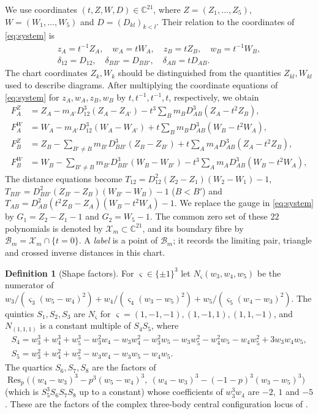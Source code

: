 \documentclass[11pt]{amsart}
\theoremstyle{definition}
\newtheorem{definition}[theorem]{Definition}
\theoremstyle{remark}
\newcommand{\C}{\mathbb{C}}
\begin{document}
{We use coordinates $(t,Z,W,D)\in\C^{21}$, where $Z=(Z_1,\dots,Z_5)$,
$W=(W_1,\dots,W_5)$ and $D=(D_{kl})_{k<l}$.  Their relation to the coordinates of
\eqref{eq:system} is}
\begin{equation}\label{eq:d2-chart}
\begin{gathered}
  z_A=t^{-1}Z_A,\quad w_A=tW_A,\quad z_B=tZ_B,\quad w_B=t^{-1}W_B,\\
  \delta_{12}=D_{12},\quad \delta_{BB'}=D_{BB'},\quad \delta_{AB}=tD_{AB}.
\end{gathered}
\end{equation}
{The chart coordinates $Z_k,W_k$ should be distinguished from the quantities
$Z_{kl},W_{kl}$ used to describe diagrams.  After multiplying the coordinate equations of
\eqref{eq:system} for $z_A,w_A,z_B,w_B$ by $t,t^{-1},t^{-1},t$, respectively, we obtain}
\begin{equation}\label{eq:d2-rows}
\begin{aligned}
  F^Z_A&=Z_A-m_{A'}D_{12}^3(Z_A-Z_{A'})-t^3\textstyle\sum_Bm_BD_{AB}^3(Z_A-t^2Z_B),\\
  F^W_A&=W_A-m_{A'}D_{12}^3(W_A-W_{A'})+t\textstyle\sum_Bm_BD_{AB}^3(W_B-t^2W_A),\\
  F^Z_B&=Z_B-\textstyle\sum_{B'\ne B}m_{B'}D_{BB'}^3(Z_B-Z_{B'})
         +t\textstyle\sum_Am_AD_{AB}^3(Z_A-t^2Z_B),\\
  F^W_B&=W_B-\textstyle\sum_{B'\ne B}m_{B'}D_{BB'}^3(W_B-W_{B'})
         -t^3\textstyle\sum_Am_AD_{AB}^3(W_B-t^2W_A),
\end{aligned}
\end{equation}
{The distance equations become $T_{12}=D_{12}^2(Z_2-Z_1)(W_2-W_1)-1$,
$T_{BB'}=D_{BB'}^2(Z_{B'}-Z_B)(W_{B'}-W_B)-1$ ($B<B'$) and
$T_{AB}=D_{AB}^2(t^2Z_B-Z_A)(W_B-t^2W_A)-1$.
We replace the gauge in \eqref{eq:system} by $G_1=Z_2-Z_1-1$ and $G_2=W_5-1$.
The common zero set of these $22$ polynomials is denoted by $\mathcal X_m\subset\C^{21}$,
and its boundary fibre by $\mathcal B_m=\mathcal X_m\cap\{t=0\}$.
A \emph{label} is a point of $\mathcal B_m$; it records the limiting pair, triangle and
crossed inverse distances in this chart.}

\begin{definition}[Shape factors]\label{def:d2-shapes}
For $\varsigma\in\{\pm1\}^3$ let $N_\varsigma(w_3,w_4,w_5)$ be the numerator of
$w_3/(\varsigma_3(w_5-w_4)^2)+w_4/(\varsigma_4(w_3-w_5)^2)+w_5/(\varsigma_5(w_4-w_3)^2)$.  The
quintics $S_1,S_2,S_3$ are $N_\varsigma$ for $\varsigma=(1,-1,-1),(1,-1,1),(1,1,-1)$, and
$N_{(1,1,1)}$ is a constant multiple of $S_4S_5$, where
\begin{gather*}
  S_4=w_3^3+w_4^3+w_5^3-w_3^2w_4-w_3w_4^2-w_3^2w_5-w_3w_5^2-w_4^2w_5-w_4w_5^2+3w_3w_4w_5,\\
  S_5=w_3^2+w_4^2+w_5^2-w_3w_4-w_3w_5-w_4w_5 .
\end{gather*}
The quartics $S_6,S_7,S_8$ are the factors of
$\operatorname{Res}_p\bigl((w_4-w_3)^3-p^3(w_5-w_4)^3,\ (w_4-w_3)^3-(-1-p)^3(w_3-w_5)^3\bigr)$
(which is $S_5^3S_6S_7S_8$ up to a constant) whose coefficients of $w_3^3w_4$ are $-2$, $1$ and
$-5$.  These are the factors of the complex three-body central configuration locus of
\cite[Appendix, pp.~585--586]{AK}.
\end{definition}
\end{document}
